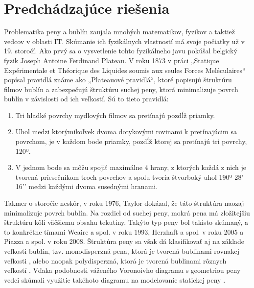 \chapter{Predchádzajúce riešenia}\label{chap:previous_solutions}

Problematika peny a bublín zaujala mnohých matematikov, fyzikov a taktiež vedcov v oblasti IT. Skúmanie ich fyzikálnych vlastností má svoje počiatky už v 19. storočí. Ako prvý sa o vysvetlenie tohto fyzikálneho javu pokúšal belgický fyzik Joseph Antoine Ferdinand Plateau. V roku 1873 v práci „Statique Expérimentale et Théorique des Liquides soumis aux seules Forces Meléculaires“ \cite{plateau1873} popísal pravidlá známe ako „Plateauové pravidlá“, ktoré popisujú štruktúru filmov bublín a zabezpečujú štruktúru suchej peny, ktorá minimalizuje povrch bublín v závislosti od ich veľkostí. Sú to tieto pravidlá:

\begin{enumerate}
  \item Tri hladké povrchy mydlových filmov sa pretínajú pozdĺž priamky.
  \item Uhol medzi ktorýmikoľvek dvoma dotykovými rovinami k pretínajúcim sa povrchom, je v každom bode priamky, pozdĺž ktorej sa pretínajú tri povrchy, 120º.
  \item V jednom bode sa môžu spojiť maximálne 4 hrany, z ktorých každá z nich je tvorená priesečníkom troch povrchov a spolu tvoria štvorboký uhol 190º 28’ 16’’ medzi každými dvoma susednými hranami.
\end{enumerate}

Takmer o storočie neskôr, v roku 1976, Taylor \cite{taylor1976} dokázal, že táto štruktúra naozaj minimalizuje povrch bublín. Na rozdiel od suchej peny, mokrá pena má zložitejšiu štruktúru kôli väčšiemu obsahu tekutiny. Takýto typ peny bol takisto skúmaný, a to konkrétne tímami Weaire a spol. \cite{weaire1993} v roku 1993, Herzhaft a spol. \cite{herzhaft2005} v roku 2005 a Piazza a spol. \cite{piazza2008} v roku 2008. Štruktúra peny sa však dá klasifikovať aj na základe veľkosti bublín, tzv. monodisperzná pena, ktorá je tvorená bublinami rovnakej veľkosti \cite{kraynik2003}, alebo naopak polydisperzná, ktorá je tvorená bublinami rôznych veľkostí \cite{kraynik2004}. Vďaka podobnosti váženého Voronoivho diagramu s geometriou peny vedci skúmali využitie takéhoto diagramu na modelovanie statickej peny \cite{redenbach2012}.

